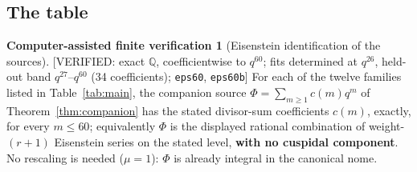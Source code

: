 \documentclass[11pt,reqno]{amsart}
\theoremstyle{plain}
\theoremstyle{definition}
\newtheorem{verification}[theorem]{Computer-assisted finite verification}
\theoremstyle{remark}
\newcommand{\Q}{\mathbb{Q}}
\newcommand{\VerifiedR}[1]{\textup{\textsf{[VERIFIED: #1]}}}
\begin{document}
\subsection{The table}

\begin{verification}[Eisenstein identification of the sources]
\label{ver:main}
\VerifiedR{exact $\Q$, coefficientwise to $q^{60}$; fits determined at
$q^{26}$, held-out band $q^{27}$--$q^{60}$ (34 coefficients);
\texttt{eps60}, \texttt{eps60b}}
For each of the twelve families listed in Table~\ref{tab:main}, the
companion source $\Phi=\sum_{m\ge1}c(m)q^m$ of
Theorem~\ref{thm:companion} has the stated divisor-sum coefficients
$c(m)$, exactly, for every $m\le60$; equivalently $\Phi$ is the
displayed rational combination of weight-$(r+1)$ Eisenstein series on the
stated level, \textbf{with no cuspidal component}. No rescaling is needed
($\mu=1$): $\Phi$ is already integral in the canonical nome.
\end{verification}
\end{document}
